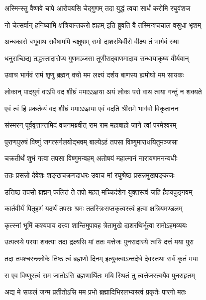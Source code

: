 \twolineshloka
{अस्मिन्स्तु वैष्णवे चापे आरोपयसि चेद्गुणम्}
{तदा युद्धं त्वया सार्धं करोमि रघुवंशज} %

\twolineshloka
{नो चेत्सर्वान् हनिष्यामि क्षत्रियान्तकरो ह्यहम्}
{इति ब्रुवति वै तस्मिन्श्चचाल वसुधा भृशम्} %

\twolineshloka
{अन्धकारो बभूवाथ सर्वेषामपि चक्षुषाम्}
{रामो दाशरथिर्वीरो वीक्ष्य तं भार्गवं रुषा} %

\twolineshloka
{धनुराच्छिद्य तद्धस्तादारोप्य गुणमञ्जसा}
{तूणीराद्बाणमादाय सन्धायाकृष्य वीर्यवान्} %

\twolineshloka
{उवाच भार्गवं रामं शृणु ब्रह्मन् वचो मम}
{लक्ष्यं दर्शय बाणस्य ह्यमोघो मम सायकः} %

\twolineshloka
{लोकान् पादयुगं वाऽपि वद शीघ्रं ममाऽऽज्ञया}
{अयं लोकः परो वाथ त्वया गन्तुं न शक्यते} %

\twolineshloka
{एवं त्वं हि प्रकर्तव्यं वद शीघ्रं ममाऽऽज्ञया}
{एवं वदति श्रीरामे भार्गवो विकृताननः} %

\twolineshloka
{संस्मरन् पूर्ववृत्तान्तमिदं वचनमब्रवीत्}
{राम राम महाबाहो जाने त्वां परमेश्वरम्} %

\twolineshloka
{पुराणपुरुषं विष्णुं जगत्सर्गलयोद्भवम्}
{बाल्येऽहं तपसा विष्णुमाराधयितुमञ्जसा} %

\twolineshloka
{चक्रतीर्थं शुभं गत्वा तपसा विष्णुमन्वहम्}
{अतोषयं महात्मानं नारायणमनन्यधीः} %

\twolineshloka
{ततः प्रसन्नो देवेशः शङ्खचक्रगदाधरः}
{उवाच मां रघुश्रेष्ठ प्रसन्नमुखपङ्कजः} %


\twolineshloka
{उत्तिष्ठ तपसो ब्रह्मन् फलितं ते तपो महत्}
{मच्चिदंशेन युक्तस्त्वं जहि हैहयपुङ्गवम्} %

\twolineshloka
{कार्तवीर्यं पितृहणं यदर्थं तपसः श्रमः}
{ततस्त्रिःसप्तकृत्वस्त्वं हत्वा क्षत्रियमण्डलम्} %

\twolineshloka
{कृत्स्नां भूमिं कश्यपाय दत्त्वा शान्तिमुपावह}
{त्रेतामुखे दाशरथिर्भूत्वा रामोऽहमव्ययः} %

\twolineshloka
{उत्पत्स्ये परया शक्त्या तदा द्रक्ष्यसि मां ततः}
{मत्तेजः पुनरादास्ये त्वयि दत्तं मया पुरा} %

\twolineshloka
{तदा तपश्चरन्ल्लोके तिष्ठ त्वं ब्रह्मणो दिनम्}
{इत्युक्त्वाऽन्तर्दधे देवस्तथा सर्वं कृतं मया} %

\twolineshloka
{स एव विष्णुस्त्वं राम जातोऽसि ब्रह्मणार्थितः}
{मयि स्थितं तु त्वत्तेजस्त्वयैव पुनराहृतम्} %

\twolineshloka
{अद्य मे सफलं जन्म प्रतीतोऽसि मम प्रभो}
{ब्रह्मादिभिरलभ्यस्त्वं प्रकृतेः पारगो मतः} %

